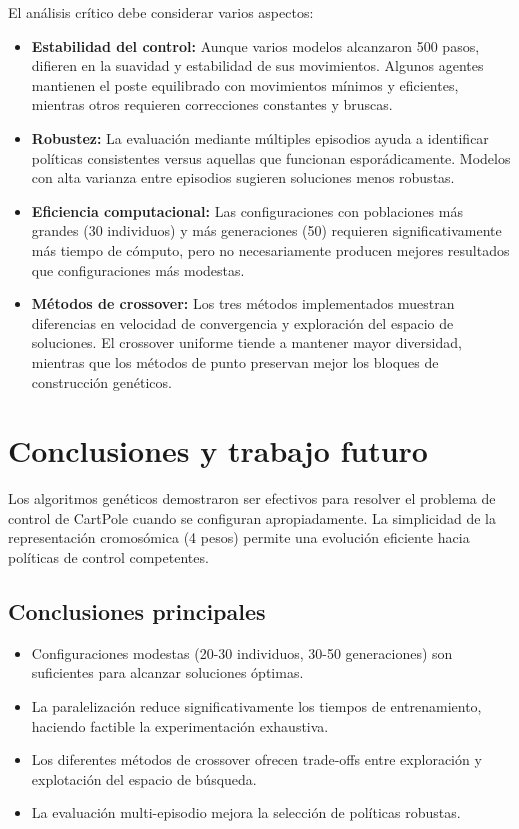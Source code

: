 \documentclass[12pt,a4paper]{article}
\begin{document}
El análisis crítico debe considerar varios aspectos:

\begin{itemize}
    \item \textbf{Estabilidad del control:} Aunque varios modelos alcanzaron 500 pasos, difieren en la suavidad y estabilidad de sus movimientos. Algunos agentes mantienen el poste equilibrado con movimientos mínimos y eficientes, mientras otros requieren correcciones constantes y bruscas.
    \item \textbf{Robustez:} La evaluación mediante múltiples episodios ayuda a identificar políticas consistentes versus aquellas que funcionan esporádicamente. Modelos con alta varianza entre episodios sugieren soluciones menos robustas.
    \item \textbf{Eficiencia computacional:} Las configuraciones con poblaciones más grandes (30 individuos) y más generaciones (50) requieren significativamente más tiempo de cómputo, pero no necesariamente producen mejores resultados que configuraciones más modestas.
    \item \textbf{Métodos de crossover:} Los tres métodos implementados muestran diferencias en velocidad de convergencia y exploración del espacio de soluciones. El crossover uniforme tiende a mantener mayor diversidad, mientras que los métodos de punto preservan mejor los bloques de construcción genéticos.
\end{itemize}

\section{Conclusiones y trabajo futuro}
Los algoritmos genéticos demostraron ser efectivos para resolver el problema de control de CartPole cuando se configuran apropiadamente. La simplicidad de la representación cromosómica (4 pesos) permite una evolución eficiente hacia políticas de control competentes.

\subsection*{Conclusiones principales}
\begin{itemize}
    \item Configuraciones modestas (20-30 individuos, 30-50 generaciones) son suficientes para alcanzar soluciones óptimas.
    \item La paralelización reduce significativamente los tiempos de entrenamiento, haciendo factible la experimentación exhaustiva.
    \item Los diferentes métodos de crossover ofrecen trade-offs entre exploración y explotación del espacio de búsqueda.
    \item La evaluación multi-episodio mejora la selección de políticas robustas.
\end{itemize}
\end{document}
